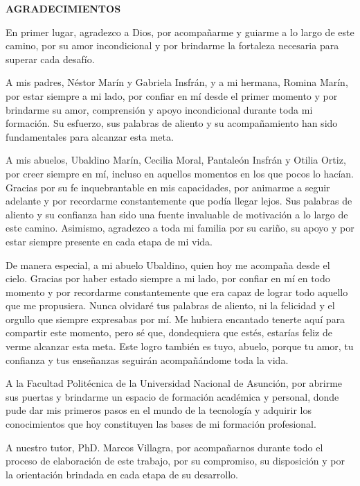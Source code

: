 \centerline{\textbf{\large AGRADECIMIENTOS}}

\vspace{0.5cm}

\enlargethispage{2\baselineskip}
En primer lugar, agradezco a Dios, por acompañarme y guiarme a lo largo de este camino, por su
amor incondicional y por brindarme la fortaleza necesaria para superar cada desafío.

A mis padres, Néstor Marín y Gabriela Insfrán, y a mi hermana, Romina Marín, por estar siempre a
mi lado, por confiar en mí desde el primer momento y por brindarme su amor, comprensión y apoyo
incondicional durante toda mi formación. Su esfuerzo, sus palabras de aliento y su acompañamiento
han sido fundamentales para alcanzar esta meta.

A mis abuelos, Ubaldino Marín, Cecilia Moral, Pantaleón Insfrán y Otilia Ortiz, por creer siempre
en mí, incluso en aquellos momentos en los que pocos lo hacían. Gracias por su fe inquebrantable en
mis capacidades, por animarme a seguir adelante y por recordarme constantemente que podía llegar
lejos. Sus palabras de aliento y su confianza han sido una fuente invaluable de motivación a lo
largo de este camino. Asimismo, agradezco a toda mi familia por su cariño, su apoyo y por estar
siempre presente en cada etapa de mi vida.

De manera especial, a mi abuelo Ubaldino, quien hoy me acompaña desde el cielo. Gracias por haber estado siempre a mi lado, por confiar en mí en todo momento y por recordarme constantemente que era capaz de lograr todo aquello que me propusiera. Nunca olvidaré tus palabras de aliento, ni la felicidad y el orgullo que siempre expresabas por mí. Me hubiera encantado tenerte aquí para compartir este momento, pero sé que, dondequiera que estés, estarías feliz de verme alcanzar esta meta. Este logro también es tuyo, abuelo, porque tu amor, tu confianza y tus enseñanzas seguirán acompañándome toda la vida.

A la Facultad Politécnica de la Universidad Nacional de Asunción, por abrirme sus puertas y
brindarme un espacio de formación académica y personal, donde pude dar mis primeros pasos en el
mundo de la tecnología y adquirir los conocimientos que hoy constituyen las bases de mi formación
profesional.

A nuestro tutor, PhD. Marcos Villagra, por acompañarnos durante todo el proceso de elaboración de
este trabajo, por su compromiso, su disposición y por la orientación brindada en cada etapa de su
desarrollo.

